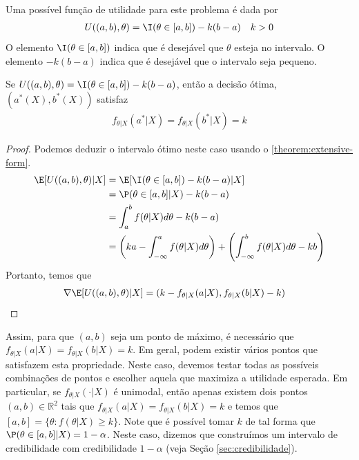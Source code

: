 Uma possível função de utilidade para 
este problema é dada por
\begin{align*}
U((a,b),\theta)
&= \I(\theta \in [a,b]) -k(b-a)
& k > 0
\end{align*}
O elemento $\I(\theta \in [a,b])$ indica que 
é desejável que $\theta$ esteja no intervalo.
O elemento $-k(b-a)$ indica que 
é desejável que o intervalo seja pequeno.
\begin{theorem}
\label{thm:credible_interval_1}
Se $U((a,b),\theta) = \I(\theta \in [a,b]) -k(b-a)$,
então a decisão ótima, $(a^{*}(X),b^{*}(X))$ satisfaz
\begin{align*}
f_{\theta|X}(a^{*}|X)
=f_{\theta|X}(b^{*}|X) = k
\end{align*}
\end{theorem}
\begin{proof}
Podemos deduzir o intervalo ótimo neste caso 
usando o \cref{theorem:extensive-form}. 
\begin{align*}
\E[U((a,b),\theta)|X]	
&= \E[\I(\theta \in [a,b]) -k(b-a)|X] \\
&= \P(\theta \in [a,b]|X) -k(b-a) \\
&= \int_{a}^{b}{f(\theta|X)d\theta} -k(b-a) \\
&= \left(ka-\int_{-\infty}^{a}{f(\theta|X)d\theta}\right) 
+\left(\int_{-\infty}^{b}{f(\theta|X)d\theta}-kb\right)
\end{align*}
Portanto, temos que
\begin{align*}
\nabla \E[U((a,b),\theta)|X]
&= (k-f_{\theta|X}(a|X), f_{\theta|X}(b|X)-k)
\end{align*}
\end{proof}
Assim, para que $(a,b)$ seja um ponto de máximo,
é necessário que
$f_{\theta|X}(a|X) = f_{\theta|X}(b|X) = k$.
Em geral, podem existir vários pontos que 
satisfazem esta propriedade.
Neste caso, devemos testar 
todas as possíveis combinações de pontos
e escolher aquela que maximiza a utilidade esperada.
Em particular, se $f_{\theta|X}(\cdot|X)$ é unimodal, 
então apenas existem dois pontos 
$(a,b) \in \mathbb{R}^{2}$ tais que 
$f_{\theta|X}(a|X) = f_{\theta|X}(b|X) = k$ e temos que
$[a,b] = \{\theta: f(\theta|X) \geq k\}$.
Note que é possível tomar $k$ de tal forma que 
$\P(\theta \in [a,b]|X) = 1-\alpha$.
Neste caso, dizemos que construímos um 
intervalo de credibilidade com 
credibilidade $1-\alpha$ (veja Seção \ref{sec:credibilidade}).

